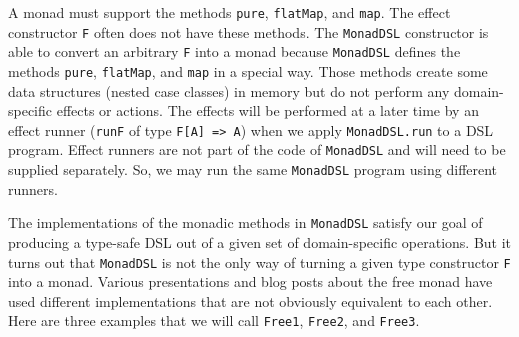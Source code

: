 A monad must support the methods \lstinline!pure!,
\lstinline!flatMap!, and
\lstinline!map!. The effect
constructor \lstinline!F!
often does not have these methods. The \lstinline!MonadDSL!
constructor is able to convert an arbitrary \lstinline!F!
into a monad because \lstinline!MonadDSL!
defines the methods \lstinline!pure!,
\lstinline!flatMap!, and
\lstinline!map! in a special
way. Those methods create some data structures (nested case classes)
in memory but do not perform any domain-specific effects or actions.
The effects will be performed at a later time by an effect runner
(\lstinline!runF! of type
\lstinline!F[A] => A!)
when we apply \lstinline!MonadDSL.run!
to a DSL program. Effect runners are not part of the code of \lstinline!MonadDSL!
and will need to be supplied separately. So, we may run the same \lstinline!MonadDSL!
program using different runners.

The implementations of the monadic methods in \lstinline!MonadDSL!
satisfy our goal of producing a type-safe DSL out of a given set of
domain-specific operations. But it turns out that \lstinline!MonadDSL!
is not the only way of turning a given type constructor \lstinline!F!
into a monad. Various presentations and blog posts about the free
monad have used different implementations that are not obviously equivalent
to each other. Here are three examples that we will call \lstinline!Free1!,
\lstinline!Free2!, and
\lstinline!Free3!. 

